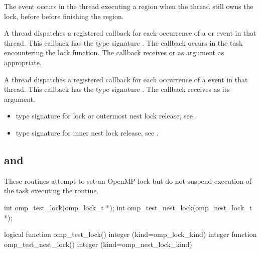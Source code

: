 The  event occurs in the thread 
executing a  region
when the thread still owns the lock, 
before before finishing the region.


\tools

A thread dispatches a registered 
callback for each occurrence of a  or  event 
in that thread.  This callback has the type signature .
The callback occurs in the task encountering
the lock function.  The callback receives  or 
  as  argument as appropriate.

A thread dispatches a registered 
callback for each occurrence of a  event 
in that thread. This callback has the type signature .
The callback receives  as its  argument.

\crossreferences
\begin{itemize}
\item {} type signature for lock
  or outermost nest lock release, see .
\item {} type signature for inner nest lock
  release, see .
\end{itemize}








\subsection{ and }
\label{subsec:omp_test_lock and omp_test_nest_lock}
\summary
These routines attempt to set an OpenMP lock but do not suspend execution of the task 
executing the routine.

\format
\ccppspecificstart
\begin{boxedcode}
int omp\_test\_lock(omp\_lock\_t *);
int omp\_test\_nest\_lock(omp\_nest\_lock\_t *);
\end{boxedcode}
\ccppspecificend

\fortranspecificstart
\begin{boxedcode}
logical function omp\_test\_lock()
integer (kind=omp\_lock\_kind) 
integer function omp\_test\_nest\_lock()
integer (kind=omp\_nest\_lock\_kind) 
\end{boxedcode}
\fortranspecificend

